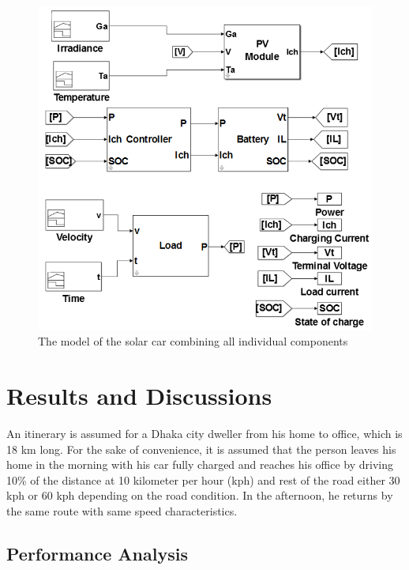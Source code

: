 \documentclass[journal]{IEEEtran/IEEEtran}
\begin{document}
	\begin{figure}[!tb]
		\centering
		\includegraphics[width=\linewidth]{solar_car.png}
		\caption{The model of the solar car combining all individual components}
		\label{fig:solarcar}
	\end{figure}
	
	\section{Results and Discussions}
	An itinerary is assumed for a Dhaka city dweller from his home to office, which is 18 km long. For the sake of convenience, it is assumed that the person leaves his home in the morning with his car fully charged and reaches his office by driving 10\% of the distance at 10 kilometer per hour (kph) and rest of the road either 30 kph or 60 kph depending on the road condition. In the afternoon, he returns by the same route with same speed characteristics.
	
	\subsection{Performance Analysis}
	
\end{document}
